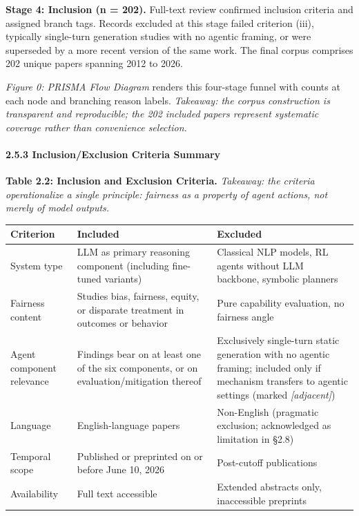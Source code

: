 \documentclass[10pt]{article}
\begin{document}
\textbf{Stage 4: Inclusion (n = 202).} Full-text review confirmed inclusion criteria and assigned branch tags. Records excluded at this stage failed criterion (iii), typically single-turn generation studies with no agentic framing, or were superseded by a more recent version of the same work. The final corpus comprises 202 unique papers spanning 2012 to 2026.

\emph{Figure 0: PRISMA Flow Diagram} renders this four-stage funnel with counts at each node and branching reason labels. \emph{Takeaway: the corpus construction is transparent and reproducible; the 202 included papers represent systematic coverage rather than convenience selection.}

\paragraph*{2.5.3 Inclusion/Exclusion Criteria Summary}

\textbf{Table 2.2: Inclusion and Exclusion Criteria.} \emph{Takeaway: the criteria operationalize a single principle: fairness as a property of agent actions, not merely of model outputs.}

\begin{center}\footnotesize
\begin{longtable}{|p{}|p{}|p{}|}
\hline \textbf{Criterion} & \textbf{Included} & \textbf{Excluded} \\ \hline\endhead
System type & LLM as primary reasoning component (including fine-tuned variants) & Classical NLP models, RL agents without LLM backbone, symbolic planners \\ \hline
Fairness content & Studies bias, fairness, equity, or disparate treatment in outcomes or behavior & Pure capability evaluation, no fairness angle \\ \hline
Agent component relevance & Findings bear on at least one of the six components, or on evaluation/mitigation thereof & Exclusively single-turn static generation with no agentic framing; included only if mechanism transfers to agentic settings (marked \emph{[adjacent]}) \\ \hline
Language & English-language papers & Non-English (pragmatic exclusion; acknowledged as limitation in \S{}2.8) \\ \hline
Temporal scope & Published or preprinted on or before June 10, 2026 & Post-cutoff publications \\ \hline
Availability & Full text accessible & Extended abstracts only, inaccessible preprints \\ \hline
\end{longtable}\end{center}
\end{document}

